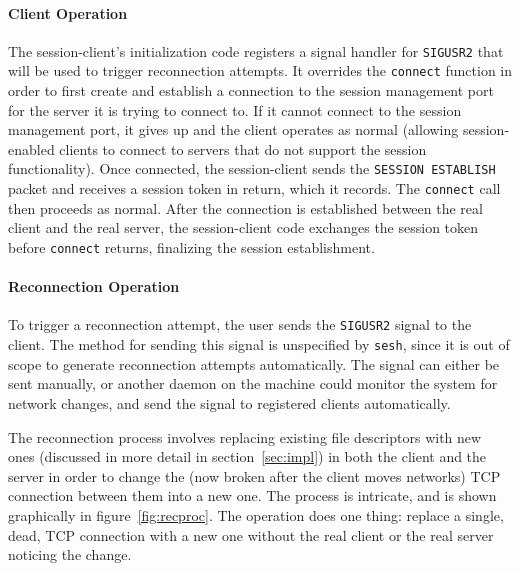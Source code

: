 \documentclass[twocolumn,10pt]{article}
\newcommand{\sesh}{\texttt{sesh}\xspace}
\begin{document}
\paragraph{Client Operation}
The session-client's initialization code registers a signal handler for
\texttt{SIGUSR2} that will be used to trigger reconnection attempts. It
overrides the \texttt{connect} function in order to first create and establish a
connection to the session management port for the server it is trying to connect
to. If it cannot connect to the session management port, it gives up and the
client operates as normal (allowing session-enabled clients to connect to
servers that do not support the session functionality). Once connected, the
session-client sends the \texttt{SESSION ESTABLISH} packet and receives a
session token in return, which it records. The \texttt{connect} call then proceeds as
normal. After the connection is established between the real client and the real
server, the session-client code exchanges the session token before
\texttt{connect} returns, finalizing the session establishment.


\paragraph{Reconnection Operation}
To trigger a reconnection attempt, the user sends the \texttt{SIGUSR2} signal to
the client. The method for sending this signal is unspecified by \sesh, since it
is out of scope to generate reconnection attempts automatically. The signal can
either be sent manually, or another daemon on the machine could monitor the
system for network changes, and send the signal to registered clients
automatically.

The reconnection process involves replacing existing file descriptors with new
ones (discussed in more detail in section~\ref{sec:impl}) in both the client and
the server in order to change the (now broken after the client moves networks)
TCP connection between them into a new one. The process is intricate, and is
shown graphically in figure~\ref{fig:recproc}. The operation does one thing:
replace a single, dead, TCP connection with a new one without the real client or
the real server noticing the change.
\end{document}
